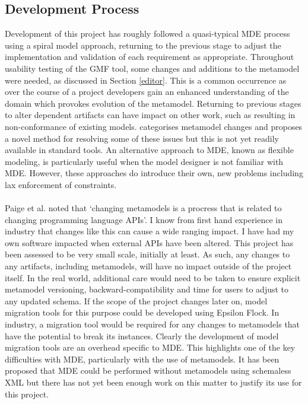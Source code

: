 \documentclass{article}
\begin{document}
\subsection{Development Process}
Development of this project has roughly followed a quasi-typical MDE process\cite{paige2017changing} using a spiral model approach, returning to the previous stage to adjust the implementation and validation of each requirement as appropriate. Throughout usability testing of the GMF tool, some changes and additions to the metamodel were needed, as discussed in Section \ref{editor}. This is a common occurrence as over the course of a project developers gain an enhanced understanding of the domain which provokes evolution of the metamodel\cite{evolving_models}. Returning to previous stages to alter dependent artifacts can have impact on other work, such as resulting in non-conformance of existing models. \cite{metamodel_sync} categorises metamodel changes and proposes a novel method for resolving some of these issues but this is not yet readily available in standard tools. An alternative approach to MDE, known as flexible modeling, is particularly useful when the model designer is not familiar with MDE. However, these approaches do introduce their own, new problems including lax enforcement of constraints\cite{paige2017changing}.
\\\\
Paige et al. noted that `changing metamodels is a procress that is related to changing programming language APIs'\cite{evolving_models}. I know from first hand experience in industry that changes like this can cause a wide ranging impact. I have had my own software impacted when external APIs have been altered. This project has been assessed to be very small scale, initially at least. As such, any changes to any artifacts, including metamodels, will have no impact outside of the project itself. In the real world, additional care would need to be taken to ensure explicit metamodel versioning, backward-compatibility and time for users to adjust to any updated schema. If the scope of the project changes later on, model migration tools for this purpose could be developed using Epsilon Flock. In industry, a migration tool would be required for any changes to metamodels that have the potential to break its instances. Clearly the development of model migration tools are an overhead specific to MDE. This highlights one of the key difficulties with MDE, particularly with the use of metamodels. It has been proposed that MDE could be performed without metamodels using schemaless XML\cite{evolving_models} but there has not yet been enough work on this matter to justify its use for this project.
\end{document}
